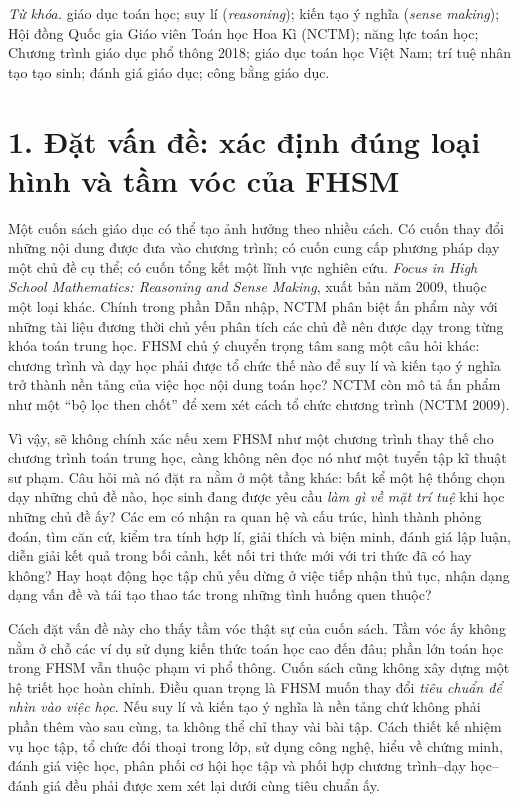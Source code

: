 \vspace{0.75\baselineskip}

\noindent
\textit{Từ khóa.} giáo dục toán học; suy lí (\textit{reasoning}); kiến tạo ý nghĩa (\textit{sense making}); Hội đồng Quốc gia Giáo viên Toán học Hoa Kì (NCTM); năng lực toán học; Chương trình giáo dục phổ thông 2018; giáo dục toán học Việt Nam; trí tuệ nhân tạo tạo sinh; đánh giá giáo dục; công bằng giáo dục.

\endgroup

\clearpage

{}
\section*{1. Đặt vấn đề: xác định đúng loại hình và tầm vóc của FHSM}

Một cuốn sách giáo dục có thể tạo ảnh hưởng theo nhiều cách. Có cuốn thay đổi những nội dung được đưa vào chương trình; có cuốn cung cấp phương pháp dạy một chủ đề cụ thể; có cuốn tổng kết một lĩnh vực nghiên cứu. \emph{Focus in High School Mathematics: Reasoning and Sense Making}, xuất bản năm 2009, thuộc một loại khác. Chính trong phần Dẫn nhập, NCTM phân biệt ấn phẩm này với những tài liệu đương thời chủ yếu phân tích các chủ đề nên được dạy trong từng khóa toán trung học. FHSM chủ ý chuyển trọng tâm sang một câu hỏi khác: chương trình và dạy học phải được tổ chức thế nào để suy lí và kiến tạo ý nghĩa trở thành nền tảng của việc học nội dung toán học? NCTM còn mô tả ấn phẩm như một ``bộ lọc then chốt'' để xem xét cách tổ chức chương trình (NCTM 2009).

Vì vậy, sẽ không chính xác nếu xem FHSM như một chương trình thay thế cho chương trình toán trung học, càng không nên đọc nó như một tuyển tập kĩ thuật sư phạm. Câu hỏi mà nó đặt ra nằm ở một tầng khác: bất kể một hệ thống chọn dạy những chủ đề nào, học sinh đang được yêu cầu \emph{làm gì về mặt trí tuệ} khi học những chủ đề ấy? Các em có nhận ra quan hệ và cấu trúc, hình thành phỏng đoán, tìm căn cứ, kiểm tra tính hợp lí, giải thích và biện minh, đánh giá lập luận, diễn giải kết quả trong bối cảnh, kết nối tri thức mới với tri thức đã có hay không? Hay hoạt động học tập chủ yếu dừng ở việc tiếp nhận thủ tục, nhận dạng dạng vấn đề và tái tạo thao tác trong những tình huống quen thuộc?

Cách đặt vấn đề này cho thấy tầm vóc thật sự của cuốn sách. Tầm vóc ấy không nằm ở chỗ các ví dụ sử dụng kiến thức toán học cao đến đâu; phần lớn toán học trong FHSM vẫn thuộc phạm vi phổ thông. Cuốn sách cũng không xây dựng một hệ triết học hoàn chỉnh. Điều quan trọng là FHSM muốn thay đổi \emph{tiêu chuẩn để nhìn vào việc học}. Nếu suy lí và kiến tạo ý nghĩa là nền tảng chứ không phải phần thêm vào sau cùng, ta không thể chỉ thay vài bài tập. Cách thiết kế nhiệm vụ học tập, tổ chức đối thoại trong lớp, sử dụng công nghệ, hiểu về chứng minh, đánh giá việc học, phân phối cơ hội học tập và phối hợp chương trình--dạy học--đánh giá đều phải được xem xét lại dưới cùng tiêu chuẩn ấy.

